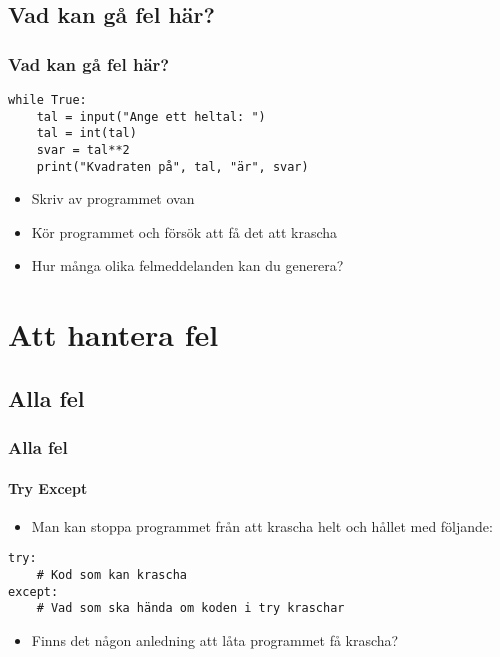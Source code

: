 \documentclass[aspectratio=169]{beamer}
\begin{document}
\subsection{Vad kan gå fel här?}

\begin{frame}[fragile]
	\frametitle{Vad kan gå fel här?}
	
	\begin{lstlisting}
while True:
    tal = input("Ange ett heltal: ")
    tal = int(tal)
    svar = tal**2
    print("Kvadraten på", tal, "är", svar)
	\end{lstlisting}
	
	\begin{itemize}
		\item Skriv av programmet ovan
		\item Kör programmet och försök att få det att krascha
		\item Hur många olika felmeddelanden kan du generera?
	\end{itemize}
	
\end{frame}

\section{Att hantera fel}

\subsection{Alla fel}

\begin{frame}[fragile]
	\frametitle{Alla fel}
	\framesubtitle{Try Except}
	
	\begin{itemize}
		\item Man kan stoppa programmet från att krascha helt och hållet med följande:
	\end{itemize}
	
	\begin{lstlisting}
try:
    # Kod som kan krascha
except:
    # Vad som ska hända om koden i try kraschar
	\end{lstlisting}
	
	\begin{itemize}
		\item Finns det någon anledning att låta programmet få krascha?
	\end{itemize}
	
\end{frame}
\end{document}
